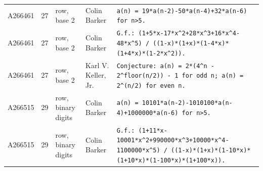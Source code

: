 \documentclass[11pt]{article}
\theoremstyle{definition}
\theoremstyle{remark}
\begin{document}
{\begin{longtable}{p{1.3cm}p{0.7cm}p{2.4cm}p{2.3cm}p{7.3cm}}
A266461 & 27 & row, base 2 & Colin Barker & \texttt{a(n)\allowbreak{} \allowbreak{}=\allowbreak{} \allowbreak{}19*\allowbreak{}a(n-\allowbreak{}2)\allowbreak{}-\allowbreak{}50*\allowbreak{}a(n-\allowbreak{}4)\allowbreak{}+\allowbreak{}32*\allowbreak{}a(n-\allowbreak{}6)\allowbreak{} \allowbreak{}for \allowbreak{}n>5.} \\
A266461 & 27 & row, base 2 & Colin Barker & \texttt{G.f.: \allowbreak{}(1+\allowbreak{}5*\allowbreak{}x-\allowbreak{}17*\allowbreak{}x\^{}2+\allowbreak{}28*\allowbreak{}x\^{}3+\allowbreak{}16*\allowbreak{}x\^{}4-\allowbreak{}48*\allowbreak{}x\^{}5)\allowbreak{} \allowbreak{}/\allowbreak{} \allowbreak{}((1-\allowbreak{}x)\allowbreak{}*\allowbreak{}(1+\allowbreak{}x)\allowbreak{}*\allowbreak{}(1-\allowbreak{}4*\allowbreak{}x)\allowbreak{}*\allowbreak{}(1+\allowbreak{}4*\allowbreak{}x)\allowbreak{}*\allowbreak{}(1-\allowbreak{}2*\allowbreak{}x\^{}2)\allowbreak{})\allowbreak{}.} \\
A266461 & 27 & row, base 2 & Karl V. Keller, Jr. & \texttt{Conjecture: \allowbreak{}a(n)\allowbreak{} \allowbreak{}=\allowbreak{} \allowbreak{}2*\allowbreak{}(4\^{}n \allowbreak{}-\allowbreak{} \allowbreak{}2\^{}floor(n/\allowbreak{}2)\allowbreak{})\allowbreak{} \allowbreak{}-\allowbreak{} \allowbreak{}1 \allowbreak{}for \allowbreak{}odd \allowbreak{}n; \allowbreak{}a(n)\allowbreak{} \allowbreak{}=\allowbreak{} \allowbreak{}2\^{}(n/\allowbreak{}2)\allowbreak{} \allowbreak{}for \allowbreak{}even \allowbreak{}n.} \\
A266515 & 29 & row, binary digits & Colin Barker & \texttt{a(n)\allowbreak{} \allowbreak{}=\allowbreak{} \allowbreak{}10101*\allowbreak{}a(n-\allowbreak{}2)\allowbreak{}-\allowbreak{}1010100*\allowbreak{}a(n-\allowbreak{}4)\allowbreak{}+\allowbreak{}1000000*\allowbreak{}a(n-\allowbreak{}6)\allowbreak{} \allowbreak{}for \allowbreak{}n>5.} \\
A266515 & 29 & row, binary digits & Colin Barker & \texttt{G.f.: \allowbreak{}(1+\allowbreak{}11*\allowbreak{}x-\allowbreak{}10001*\allowbreak{}x\^{}2+\allowbreak{}990000*\allowbreak{}x\^{}3+\allowbreak{}10000*\allowbreak{}x\^{}4-\allowbreak{}1100000*\allowbreak{}x\^{}5)\allowbreak{} \allowbreak{}/\allowbreak{} \allowbreak{}((1-\allowbreak{}x)\allowbreak{}*\allowbreak{}(1+\allowbreak{}x)\allowbreak{}*\allowbreak{}(1-\allowbreak{}10*\allowbreak{}x)\allowbreak{}*\allowbreak{}(1+\allowbreak{}10*\allowbreak{}x)\allowbreak{}*\allowbreak{}(1-\allowbreak{}100*\allowbreak{}x)\allowbreak{}*\allowbreak{}(1+\allowbreak{}100*\allowbreak{}x)\allowbreak{})\allowbreak{}.} \\

\end{longtable}}
\end{document}
